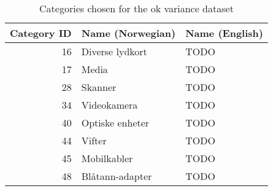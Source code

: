 \begin{table}[h]
\centering
\caption{Categories chosen for the ok variance dataset}
\label{table:dataset-ok_variance_categories}
\begin{tabular}{rll}
\toprule
 Category ID & Name (Norwegian) & Name (English) \\
\midrule
          16 &  Diverse lydkort &           TODO \\
          17 &            Media &           TODO \\
          28 &          Skanner &           TODO \\
          34 &      Videokamera &           TODO \\
          40 &  Optiske enheter &           TODO \\
          44 &           Vifter &           TODO \\
          45 &      Mobilkabler &           TODO \\
          48 &  Blåtann-adapter &           TODO \\
\bottomrule
\end{tabular}
\end{table}
